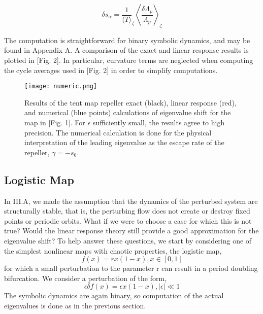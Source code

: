\documentclass[twocolumn,aip,cha]{revtex4-1}
\begin{document}
\begin{equation}
\delta s_{\alpha} = \frac{1}{\langle T \rangle}_{\zeta} \left\langle \frac{\delta \Lambda_{p}}{\Lambda_{p}} \right\rangle_{\zeta}
\end{equation}

The computation is straightforward for binary symbolic dynamics, and may be found in Appendix A. A comparison of the exact and linear response results is plotted in [Fig. 2]. In particular, curvature terms are neglected when computing the cycle averages used in [Fig. 2] in order to simplify computations.


\begin{figure}[t]
\begin{centering}
\texttt{[image: numeric.png]}

\caption{Results of the tent map repeller exact (black), linear response (red), and numerical (blue points) calculations of eigenvalue shift for the map in [Fig. 1]. For $\epsilon$ sufficiently small, the results agree to high precision. The numerical calculation is done for the physical interpretation of the leading eigenvalue as the escape rate of the repeller, $\gamma = -s_{0}$.}

\end{centering}
\end{figure}
\subsection{Logistic Map}
In III.A, we made the assumption that the dynamics of the perturbed system are structurally stable, that is, the perturbing flow does not create or destroy fixed points or periodic orbits. What if we were to choose a case for which this is not true? Would the linear response theory still provide a good approximation for the eigenvalue shift? To help answer these questions, we start by considering one of the simplest nonlinear maps with chaotic properties, the logistic map,
\begin{equation}
f(x) = rx(1 - x), x\in [0, 1]
\end{equation}
for which a small perturbation to the parameter r can result in a period doubling bifurcation. We consider a perturbation of the form,
\begin{equation}
\epsilon \delta f(x) = \epsilon x(1-x), \mid \epsilon \mid \ll 1
\end{equation}
The symbolic dynamics are again binary, so computation of the actual eigenvalues is done as in the previous section.
\end{document}
